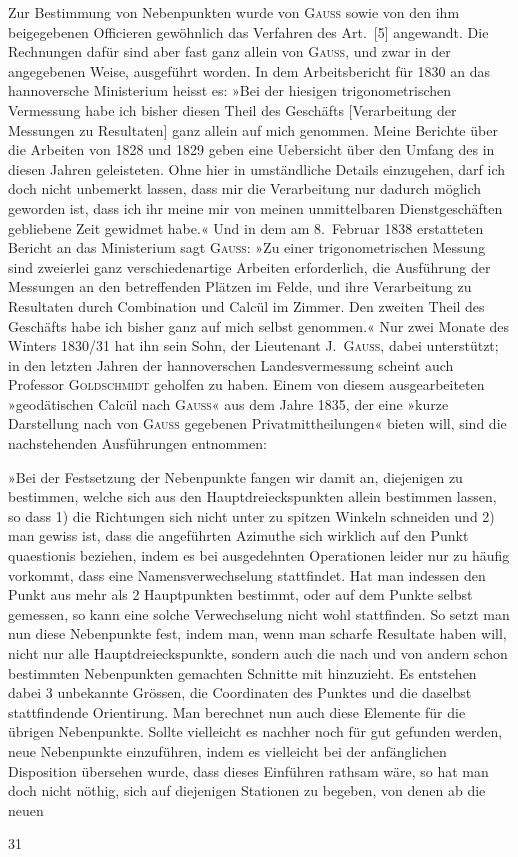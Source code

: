 Zur Bestimmung von Nebenpunkten wurde von \textsc{Gauss} sowie von den ihm beigegebenen Officieren gewöhnlich das Verfahren des Art.~[5] angewandt. Die Rechnungen dafür sind aber fast ganz allein von \textsc{Gauss}, und zwar in der angegebenen Weise, ausgeführt worden. In dem Arbeitsbericht für 1830 an das hannoversche Ministerium heisst es: »Bei der hiesigen trigonometrischen Vermessung habe ich bisher diesen Theil des Geschäfts [Verarbeitung der Messungen zu Resultaten] ganz allein auf mich genommen. Meine Berichte über die Arbeiten von 1828 und 1829 geben eine Uebersicht über den Umfang des in diesen Jahren geleisteten. Ohne hier in umständliche Details einzugehen, darf ich doch nicht unbemerkt lassen, dass mir die Verarbeitung nur dadurch möglich geworden ist, dass ich ihr meine  mir von meinen unmittelbaren Dienstgeschäften gebliebene Zeit gewidmet habe.« Und in dem am 8.~Februar 1838 erstatteten Bericht an das Ministerium sagt \textsc{Gauss}: »Zu einer trigonometrischen Messung sind zweierlei ganz verschiedenartige Arbeiten erforderlich, die Ausführung der Messungen an den betreffenden Plätzen im Felde, und ihre Verarbeitung zu Resultaten durch Combination und Calcül im Zimmer. Den zweiten Theil des Geschäfts habe ich bisher ganz auf mich selbst genommen.« Nur zwei Monate des Winters 1830/31 hat ihn sein Sohn, der Lieutenant J.~\textsc{Gauss}, dabei unterstützt; in den letzten Jahren der hannoverschen Landesvermessung scheint auch Professor \textsc{Goldschmidt} geholfen zu haben. Einem von diesem ausgearbeiteten »geodätischen Calcül nach \textsc{Gauss}« aus dem Jahre 1835, der eine »kurze Darstellung nach von \textsc{Gauss} gegebenen Privatmittheilungen« bieten will, sind die nachstehenden Ausführungen entnommen:

»Bei der Festsetzung der Nebenpunkte fangen wir damit an, diejenigen zu bestimmen, welche sich aus den Hauptdreieckspunkten allein  bestimmen lassen, so dass 1) die Richtungen sich nicht unter zu spitzen Winkeln schneiden und 2) man gewiss ist, dass die angeführten Azimuthe sich wirklich auf den Punkt quaestionis beziehen, indem es bei ausgedehnten Operationen leider nur zu häufig vorkommt, dass eine Namensverwechselung stattfindet. Hat man indessen den Punkt aus mehr als 2 Hauptpunkten bestimmt, oder auf dem Punkte selbst gemessen, so kann eine solche Verwechselung nicht wohl stattfinden. So setzt man nun diese Nebenpunkte fest, indem man, wenn man scharfe Resultate haben will, nicht nur alle Hauptdreieckspunkte, sondern auch die nach und von andern schon bestimmten Nebenpunkten gemachten Schnitte mit hinzuzieht. Es entstehen dabei 3 unbekannte Grössen, die Coordinaten des Punktes und die daselbst stattfindende Orientirung. Man berechnet nun auch diese Elemente für die übrigen Nebenpunkte. Sollte vielleicht es nachher noch für gut gefunden werden, neue Nebenpunkte einzuführen, indem es vielleicht bei der anfänglichen Disposition übersehen wurde, dass dieses Einführen rathsam wäre, so hat man doch nicht nöthig, sich auf diejenigen Stationen zu begeben, von denen ab die neuen
\par\endgroup
\vfill{}\hfill31\hspace*{2cm}
\endgroup
